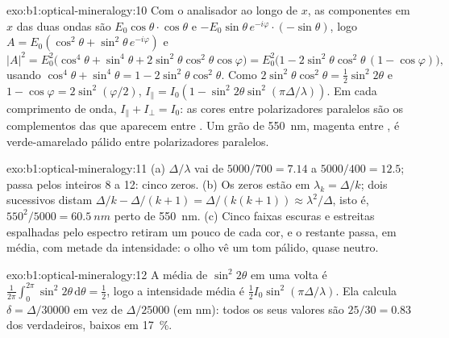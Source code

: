 \begin{solution}{exo:b1:optical-mineralogy:10}
Com o analisador ao longo de $x$, as componentes em $x$ das duas ondas são
$E_0\cos\theta\cdot\cos\theta$ e $-E_0\sin\theta\,e^{-i\varphi}\cdot(-\sin\theta)$,
logo $A = E_0(\cos^2\theta + \sin^2\theta\,e^{-i\varphi})$ e
\[
  |A|^2 = E_0^2\bigl(\cos^4\theta + \sin^4\theta + 2\sin^2\theta\cos^2\theta\cos\varphi\bigr)
  = E_0^2\bigl(1 - 2\sin^2\theta\cos^2\theta\,(1 - \cos\varphi)\bigr),
\]
usando $\cos^4\theta + \sin^4\theta = 1 - 2\sin^2\theta\cos^2\theta$. Como
$2\sin^2\theta\cos^2\theta = \frac12\sin^2 2\theta$ e $1 - \cos\varphi =
2\sin^2(\varphi/2)$, $I_\parallel = I_0(1 - \sin^2 2\theta\sin^2(\pi\Delta/\lambda))$.
Em cada comprimento de onda, $I_\parallel + I_\perp = I_0$: as cores entre polarizadores paralelos são os complementos das que aparecem entre . Um grão de \qty{550}{nm}, magenta entre , é verde-amarelado pálido entre polarizadores paralelos.
\end{solution}

\begin{solution}{exo:b1:optical-mineralogy:11}
(a) $\Delta/\lambda$ vai de $5000/700 = 7.14$ a $5000/400 = 12.5$; passa pelos inteiros 8 a 12: cinco zeros. (b) Os zeros estão em $\lambda_k = \Delta/k$; dois sucessivos distam $\Delta/k - \Delta/(k + 1) =
\Delta/(k(k + 1)) \approx \lambda^2/\Delta$, isto é, $550^2/5000 =
\qty{60.5}{nm}$ perto de \qty{550}{nm}. (c) Cinco faixas escuras e estreitas espalhadas pelo espectro retiram um pouco de cada cor, e o restante passa, em média, com metade da intensidade: o olho vê um tom pálido, quase neutro.
\end{solution}

\begin{solution}{exo:b1:optical-mineralogy:12}
A média de $\sin^2 2\theta$ em uma volta é $\frac1{2\pi}\int_0^{2\pi}\sin^2 2\theta\,
\mathrm d\theta = \frac12$, logo a intensidade média é
$\frac12 I_0\sin^2(\pi\Delta/\lambda)$. Ela calcula $\delta = \Delta/30000$
em vez de $\Delta/25000$ (em nm): todos os seus valores são $25/30 = 0.83$ dos
verdadeiros, baixos em \qty{17}{\percent}.
\end{solution}

